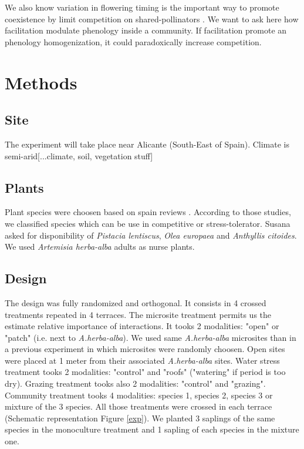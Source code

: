 \documentclass[12pt]{article} %
\begin{document}
We also know variation in flowering timing is the important way to promote coexistence by limit competition on shared-pollinators \citep{Cleland2006}. We want to ask here how facilitation modulate phenology inside a community. If facilitation promote an phenology homogenization, it could paradoxically increase competition. 

\section{Methods}
\subsection{Site}
The experiment will take place near Alicante (South-East of Spain). Climate is semi-arid[...climate, soil, vegetation stuff]

\subsection{Plants}
Plant species were choosen based on spain reviews \citep{McCluney2012,Navarro2006, Jauffret2003}. According to those studies, we classified species which can be use in competitive or stress-tolerator. Susana asked for disponibility of \textit{Pistacia lentiscus}, \textit{Olea europaea} and \textit{Anthyllis citoides}. We used \textit{Artemisia herba-alba} adults as nurse plants.

\subsection{Design}
The design was fully randomized and orthogonal. It consists in 4 crossed treatments repeated in 4 terraces. The microsite treatment permits us the estimate relative importance of interactions. It tooks 2 modalities: "open" or "patch" (i.e. next to \textit{A.herba-alba}). We used same \textit{A.herba-alba} microsites than in a previous experiment in which microsites were randomly choosen. Open sites were placed at 1 meter from their associated \textit{A.herba-alba} sites. Water stress treatment tooks 2 modalities: "control" and "roofs" ("watering" if period is too dry). Grazing treatment tooks also 2 modalities: "control" and "grazing". Community treatment tooks 4 modalities: species 1, species 2, species 3 or mixture of the 3 species. All those treatments were crossed in each terrace (Schematic representation Figure \ref{exp}). We planted 3 saplings of the same species in the monoculture treatment and 1 sapling of each species in the mixture one.
\end{document}

